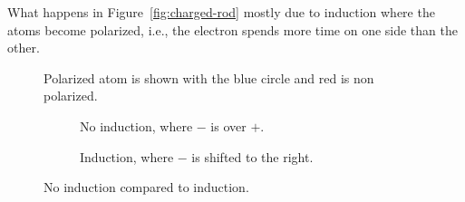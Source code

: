 What happens in Figure~\ref{fig:charged-rod} mostly due to induction where the atoms become polarized, i.e., the electron spends more time on one side than the other.
\begin{figure}[H]
\centering
{}
  \caption{Polarized atom is shown with the blue circle and red is non polarized.}
  \label{fig:polarized-atom}
\end{figure}

\begin{figure}[H]
     \centering
     \begin{subfigure}[b]{0.4\textwidth}
         \centering
         \caption{No induction, where $-$ is over $+$.}
         \label{fig:y equals x}
     \end{subfigure}
     \hfill
     \begin{subfigure}[b]{0.4\textwidth}
         \centering
         \caption{Induction, where $-$ is shifted to the right.}
         \label{fig:three sin x}
     \end{subfigure}
        \caption{No induction compared to induction.}
        \label{fig:three graphs}
\end{figure}


